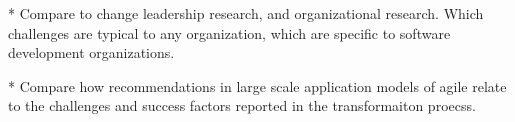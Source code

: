 \documentclass[preprint,authoryear,12pt]{elsarticle}
\begin{document}
* Compare to change leadership research, and organizational research. Which
  challenges are typical to any organization, which are specific to software
  development organizations.

* Compare how recommendations in large scale application models of agile relate
  to the challenges and success factors reported in the transformaiton proecss. 






\end{document}
